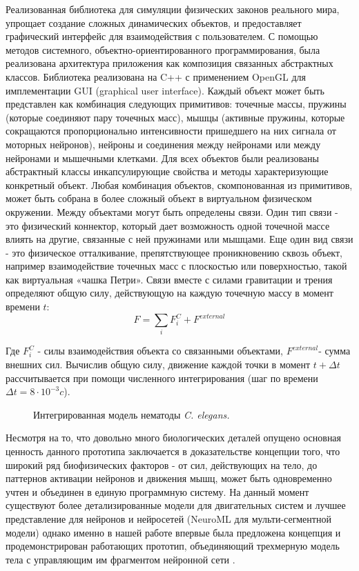 Реализованная библиотека для симуляции физических законов реального мира, упрощает создание сложных динамических объектов, и предоставляет графический интерфейс для взаимодействия с пользователем. С помощью методов системного, объектно-ориенти­рованного программирования, была реализована архитектура приложения как композиция связанных абстрактных классов. Библиотека реализована на C++ с применением OpenGL для имплементации GUI (graphical user interface). Каждый объект может быть представлен как комбинация следующих примитивов: точечные массы, пружины (которые соединяют пару точечных масс), мышцы (активные пружины, которые сокращаются пропорционально интенсивности пришедшего на них сигнала от моторных нейронов), нейроны и соединения между нейронами или между нейронами и мышечными клетками. Для всех объектов были реализованы абстрактный классы инкапсулирующие свойства и методы характеризующие конкретный объект. Любая комбинация объектов, скомпонованная из примитивов, может быть собрана в более сложный объект в виртуальном физическом окружении. Между объектами могут быть определены связи. Один тип связи - это физический коннектор, который дает возможность одной точечной массе влиять на другие, связанные с ней пружинами или мышцами. Еще один вид связи - это физическое отталкивание, препятствующее проникновению сквозь объект, например взаимодействие точечных масс с плоскостью или поверхностью, такой как виртуальная «чашка Петри». Связи вместе с силами гравитации и трения определяют общую силу, действующую на каждую точечную массу в момент времени \( t \):
\[
F=\sum_{i} F_{i}^C + F^{external}
\]

Где \( F_{i}^C \) - силы взаимодействия объекта со связанными объектами, \( F^{external}  \)- сумма внешних сил. Вычислив общую силу, движение каждой точки в момент \( t + \Delta t \) рассчитывается при помощи численного интегрирования (шаг по времени \( \Delta t = 8 \cdot 10^{-3}c \)).

\begin{figure}[ht]
  \caption{Интегрированная модель нематоды \textit{C. elegans.}}\label{fig:cyber_elegans}
\end{figure}

Несмотря на то, что довольно много биологических деталей опущено основная ценность данного прототипа заключается в доказательстве концепции того, что широкий ряд биофизических факторов - от сил, действующих на тело, до паттернов активации нейронов и движения мышц, может быть одновременно учтен и объединен в единую программную систему. На данный момент существуют более детализированные модели для двигательных систем \cite{Boyle2012} и лучшее представление для нейронов и нейросетей (NeuroML \cite {Gleeson2010} для мульти-сегментной модели) однако именно в нашей работе впервые была предложена концепция и продемонстрирован работающих прототип, объединяющий трехмерную модель тела с управляющим им фрагментом нейронной сети \cite {Palyanov2012}.

